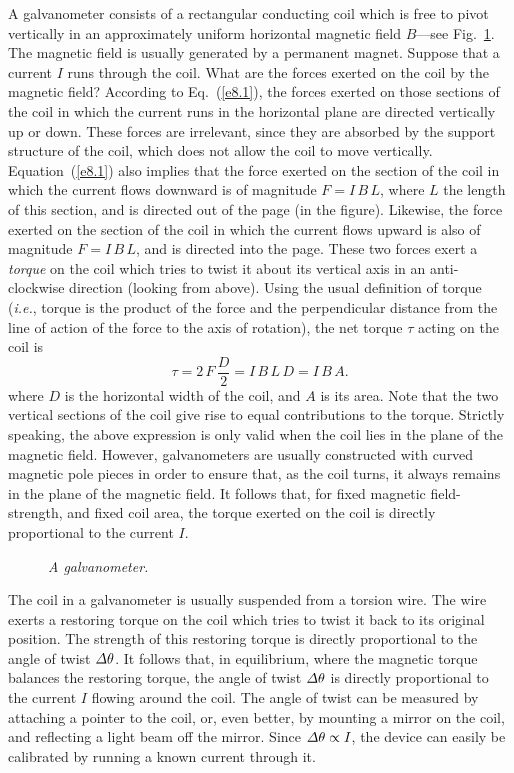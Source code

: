 A galvanometer consists of a rectangular conducting coil which is free to pivot vertically
in an approximately uniform horizontal
magnetic field $B$---see Fig.~\ref{f8.12}. The magnetic field is usually generated
by a permanent magnet. Suppose that a current $I$ runs through the coil.
What are the forces exerted on the coil by the magnetic field? 
According to Eq.~(\ref{e8.1}), the
 forces exerted on those sections of the coil in which the
current runs in the horizontal plane are directed vertically up or down.
These forces are irrelevant, since they are absorbed by the support structure of
the coil, which does not allow the coil to move vertically.
Equation~(\ref{e8.1}) also implies that  the force exerted on
the section of the coil in which the current flows downward  is of magnitude
$F= I\,B\,L$, where $L$ the length of this section, and is directed out of
the page (in the figure). Likewise, the force exerted on
the section of the coil in which the current flows upward is also of
magnitude $F= I\,B\,L$, and is directed into the page. These two forces
exert a {\em torque} on the coil which tries to twist it about its vertical
axis in an anti-clockwise direction (looking from above). Using the
usual definition of  torque ({\em i.e.}, torque is the product of
the force and the perpendicular distance from the line of action of
the force to the axis of rotation), the net torque $\tau$ acting on the coil is
\begin{equation}
\tau = 2\,F\,\frac{D}{2} = I\,B\,L\,D = I\,B\,A.
\end{equation}
where $D$ is the horizontal width of the coil, and $A$ is its area. Note
that the two vertical sections of the coil give rise to equal contributions to the
torque. 
Strictly speaking, the above expression is only valid when the coil lies in the plane of the
magnetic field. However, galvanometers are  usually constructed with curved 
magnetic pole
pieces in order to ensure that, as the coil turns, it always remains in the plane of the magnetic field. 
It follows that, for  fixed magnetic field-strength, and  fixed coil area,
the torque exerted on the coil is directly proportional to the current
$I$.

\begin{figure}[h]
\epsfysize=3in
\centerline{}
\caption{\em A galvanometer.}\label{f8.12}
\end{figure}

The coil in a galvanometer is usually suspended from a torsion wire. The
wire exerts a restoring torque on the coil which tries to twist it back to
its original position. The strength of this restoring torque is directly
proportional to the angle of twist ${\mit\Delta}\theta$.  It follows that,
in equilibrium, where the magnetic torque balances the restoring torque,
the angle of twist ${\mit\Delta}\theta$ is directly proportional
to the current $I$ flowing around  the coil. The angle of twist can be measured by 
attaching a pointer to the coil, or, even better, by mounting a mirror on the coil,
and reflecting a light beam off the mirror. Since ${\mit\Delta}\theta \propto I$, the
device can easily  be calibrated by running a known current through it.

